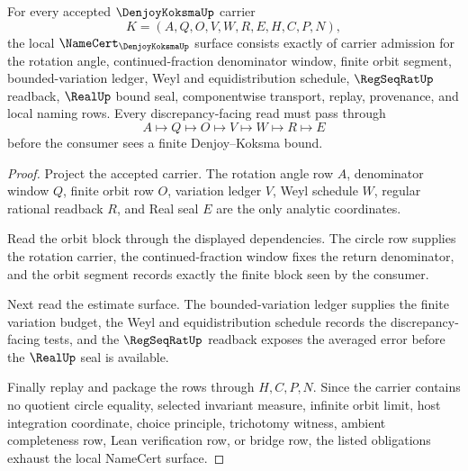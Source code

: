 \begin{theorem}
\label{thm:denjoy-koksma-namecert-obligations}
For every accepted $\DenjoyKoksmaUp$ carrier
$$
K=(A,Q,O,V,W,R,E,H,C,P,N),
$$
the local $\NameCert_{\DenjoyKoksmaUp}$ surface consists exactly of carrier admission for the rotation angle, continued-fraction denominator window, finite orbit segment, bounded-variation ledger, Weyl and equidistribution schedule, $\RegSeqRatUp$ readback, $\RealUp$ bound seal, componentwise transport, replay, provenance, and local naming rows. Every discrepancy-facing read must pass through
$$
A \longmapsto Q \longmapsto O \longmapsto V \longmapsto W \longmapsto R \longmapsto E
$$
before the consumer sees a finite Denjoy--Koksma bound.
\end{theorem}
\begin{proof}
Project the accepted carrier. The rotation angle row $A$, denominator window $Q$, finite orbit row $O$, variation ledger $V$, Weyl schedule $W$, regular rational readback $R$, and Real seal $E$ are the only analytic coordinates.

Read the orbit block through the displayed dependencies. The circle row supplies the rotation carrier, the continued-fraction window fixes the return denominator, and the orbit segment records exactly the finite block seen by the consumer.

Next read the estimate surface. The bounded-variation ledger supplies the finite variation budget, the Weyl and equidistribution schedule records the discrepancy-facing tests, and the $\RegSeqRatUp$ readback exposes the averaged error before the $\RealUp$ seal is available.

Finally replay and package the rows through $H,C,P,N$. Since the carrier contains no quotient circle equality, selected invariant measure, infinite orbit limit, host integration coordinate, choice principle, trichotomy witness, ambient completeness row, Lean verification row, or bridge row, the listed obligations exhaust the local NameCert surface.
\end{proof}

